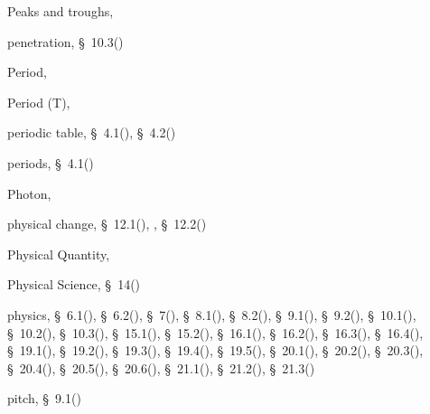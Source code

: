 \begin{multicols}{2}
{\begin{description}
	  \item[] \noindent\raggedright Peaks and troughs,  \pageref{id2439255}
	  
	  \item[] \noindent\raggedright penetration,  \S~10.3(\pageref{m38779})
	  
	  \item[] \noindent\raggedright Period,  \pageref{id2445953}
	  
	  \item[] \noindent\raggedright Period (T),  \pageref{id2440606}
	  
	  \item[] \noindent\raggedright periodic table,  \S~4.1(\pageref{m38760}),  \S~4.2(\pageref{m38757})
	  
	  \item[] \noindent\raggedright periods,  \S~4.1(\pageref{m38760})
	  
	  \item[] \noindent\raggedright Photon,  \pageref{id2452276}
	  
	  \item[] \noindent\raggedright physical change,  \S~12.1(\pageref{m38709}),  \pageref{id2458225},  \S~12.2(\pageref{m38711})
	  
	  \item[] \noindent\raggedright Physical Quantity,  \pageref{id2399394}
	  
	  \item[] \noindent\raggedright Physical Science,  \S~14(\pageref{m37830})
	  
	  \item[] \noindent\raggedright physics,  \S~6.1(\pageref{m38801}),  \S~6.2(\pageref{m38802}),  \S~7(\pageref{m38806}),  \S~8.1(\pageref{m38782}),  \S~8.2(\pageref{m38783}),  \S~9.1(\pageref{m38799}),  \S~9.2(\pageref{m38800}),  \S~10.1(\pageref{m38777}),  \S~10.2(\pageref{m38778}),  \S~10.3(\pageref{m38779}),  \S~15.1(\pageref{m38780}),  \S~15.2(\pageref{m38781}),  \S~16.1(\pageref{m38771}),  \S~16.2(\pageref{m38772}),  \S~16.3(\pageref{m38773}),  \S~16.4(\pageref{m38776}),  \S~19.1(\pageref{m38812}),  \S~19.2(\pageref{m38813}),  \S~19.3(\pageref{m38815}),  \S~19.4(\pageref{m38816}),  \S~19.5(\pageref{m38819}),  \S~20.1(\pageref{m38787}),  \S~20.2(\pageref{m38788}),  \S~20.3(\pageref{m38791}),  \S~20.4(\pageref{m38794}),  \S~20.5(\pageref{m38795}),  \S~20.6(\pageref{m38796}),  \S~21.1(\pageref{m38784}),  \S~21.2(\pageref{m38785}),  \S~21.3(\pageref{m38786})
	  
	  \item[] \noindent\raggedright pitch,  \S~9.1(\pageref{m38799})
	  

\end{description}}
\end{multicols}
